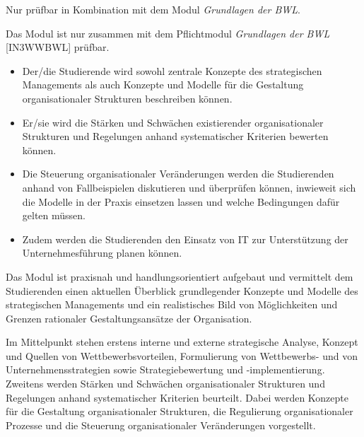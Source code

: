 \begin{module}
\begin{styleenv}
\begin{conditions}Nur prüfbar in Kombination mit dem Modul \emph{Grundlagen der BWL}.

 

Das Modul ist nur zusammen mit dem Pflichtmodul \emph{Grundlagen der BWL} [IN3WWBWL] prüfbar.

\end{conditions}


\end{styleenv}

\begin{learningoutcomes}
\begin{itemize}\item Der/die Studierende wird sowohl zentrale Konzepte des strategischen Managements als auch Konzepte und Modelle für die Gestaltung organisationaler Strukturen beschreiben können.  \item Er/sie wird die Stärken und Schwächen existierender organisationaler Strukturen und Regelungen anhand systematischer Kriterien bewerten können.  \item Die Steuerung organisationaler Veränderungen werden die Studierenden anhand von Fallbeispielen diskutieren und überprüfen können, inwieweit sich die Modelle in der Praxis einsetzen lassen und welche Bedingungen dafür gelten müssen.  \item Zudem werden die Studierenden den Einsatz von IT zur Unterstützung der Unternehmesführung planen können.  \end{itemize}
\end{learningoutcomes}

\begin{content}
Das Modul ist praxisnah und handlungsorientiert aufgebaut und vermittelt dem Studierenden einen aktuellen Überblick grundlegender Konzepte und Modelle des strategischen Managements und ein realistisches Bild von Möglichkeiten und Grenzen rationaler Gestaltungsansätze der Organisation.

 

Im Mittelpunkt stehen erstens interne und externe strategische Analyse, Konzept und Quellen von Wettbewerbsvorteilen, Formulierung von Wettbewerbs- und von Unternehmensstrategien sowie Strategiebewertung und -implementierung. Zweitens werden Stärken und Schwächen organisationaler Strukturen und Regelungen anhand systematischer Kriterien beurteilt. Dabei werden Konzepte für die Gestaltung organisationaler Strukturen, die Regulierung organisationaler Prozesse und die Steuerung organisationaler Veränderungen vorgestellt.


\end{content}



\end{module}

